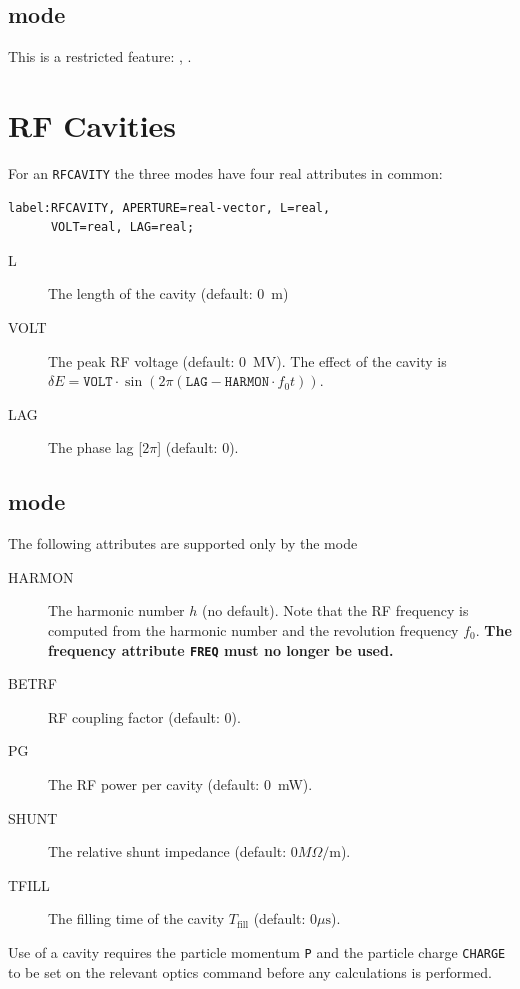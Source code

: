 \subsection{\opalcycl mode}

This is a restricted feature: \noopalt, \noopalcycl .

\section{RF Cavities}
\label{sec:cavity}
For an \texttt{RFCAVITY} the three modes have four real attributes in common:
\begin{verbatim}
label:RFCAVITY, APERTURE=real-vector, L=real, 
      VOLT=real, LAG=real;
\end{verbatim}
\begin{description}
\item[L]
  The length of the cavity (default: 0~m)
\item[VOLT]
  The peak RF voltage (default: 0~MV).
  The effect of the cavity is
  $\delta E=\mathtt{VOLT}\cdot\sin(2\pi(\mathtt{LAG}-\mathtt{HARMON}\cdot f_0 t))$.
\item[LAG]
  The phase lag [$2\pi$] (default: 0).
\end{description}

\subsection{\opalmap mode}
The following attributes are supported only by the \opalmap mode
\begin{description}
\item[HARMON]
  The harmonic number $h$ (no default).
  Note that the RF frequency is computed from the harmonic number
  and the revolution frequency $f_0$.
  \textbf{The frequency attribute \texttt{FREQ} must no longer be used.}
\item[BETRF]
  RF coupling factor (default: 0).
\item[PG]
  The RF power per cavity (default: 0~mW).
\item[SHUNT]
  The relative shunt impedance (default: $0 M\Omega/\mathrm{m}$).
\item[TFILL]
  The filling time of the cavity $T_\mathrm{fill}$
  (default: $0 \mu\mathrm{s}$).
\end{description}
Use of a cavity requires the particle momentum \texttt{P}
and the particle charge \texttt{CHARGE} to be set on the relevant 
optics command before any calculations is performed.

